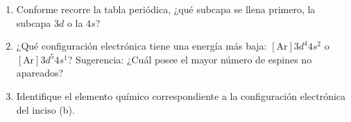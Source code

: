 \item \begin{enumerate}
    \item Conforme recorre la tabla periódica, ¿qué subcapa se llena primero, la subcapa $3d$ o la $4s$?
    \item ¿Qué configuración electrónica tiene una energía más baja: $[\text{Ar}]3d^4 4s^2$ o $[\text{Ar}]3d^5 4s^1$? Sugerencia: ¿Cuál posee el mayor número de espines no apareados?
    \item Identifique el elemento químico correspondiente a la configuración electrónica del inciso (b).
\end{enumerate}